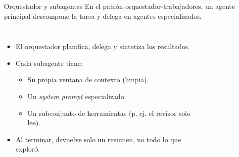 \begin{frame}{Orquestador y subagentes}
En el patrón \alert{orquestador-trabajadores}, un agente principal \alert{descompone} la tarea y \alert{delega} en agentes especializados.
 
\begin{columns}
\begin{itemize}
    \item El \alert{orquestador} planifica, delega y \alert{sintetiza} los resultados.
    \item Cada \alert{subagente} tiene:
    \begin{itemize}
        \item Su \alert{propia ventana de contexto} (limpia).
        \item Un \textit{system prompt} \alert{especializado}.
        \item Un \alert{subconjunto de herramientas} (p. ej. el revisor solo lee).
    \end{itemize}
    \item Al terminar, \alert{devuelve solo un resumen}, no todo lo que exploró.
\end{itemize}
 
\begin{figure}
    \centering
\end{figure}
\end{columns}
\end{frame}
 
